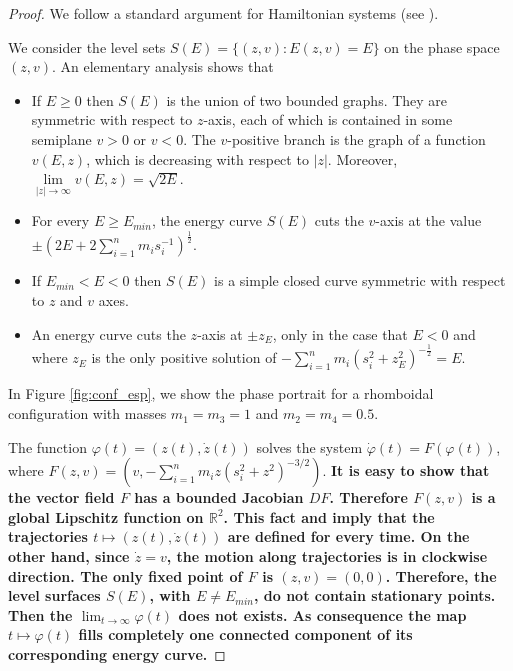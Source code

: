 \documentclass[smallcondensed]{svjour3}
\newcommand{\rr}{\mathbb{R}}
\begin{document}
\begin{proof}
We follow a standard argument for Hamiltonian systems (see \cite{A}).

We consider the level sets $S(E)=\{(z,v):E(z,v)=E\}$ on the phase space $(z,v)$. An elementary analysis shows that
\begin{itemize}
 \item If $E\geq 0$ then $S(E)$ is the union of two bounded graphs. They are symmetric with respect to $z$-axis, each of which is contained  in some semiplane $v> 0$ or $v<0$. The $v$-positive branch is the graph of a function $v(E,z)$, which  is decreasing with respect to $|z|$. Moreover, $\lim\limits_{|z|\to \infty}v(E,z)=\sqrt{2E}$.

 \item For every $E\geq E_{min}$, the energy curve $S(E)$ cuts the $v$-axis at the value $\pm(2E+2\sum_{i=1}^n m_is_i^{-1})^{\frac12}$.

 \item If $E_{min}<E<0$ then $S(E)$ is a simple closed curve symmetric with respect to $z$ and $v$ axes.

 \item  An energy curve cuts the $z$-axis at $\pm z_{E}$, only in the case that $E<0$ and where $z_E$ is the only positive solution of $-\sum_{i=1}^n m_i (s_i^2+z_{E}^2)^{-\frac12}=E$.
\end{itemize}

In Figure  \ref{fig:conf_esp}, we show the phase portrait for a rhomboidal configuration with masses $m_1=m_3=1$ and $m_2=m_4=0.5$.

The function $\varphi(t)=(z(t),\dot{z}(t))$ solves the system $\dot{\varphi}(t)=F(\varphi(t))$, where \linebreak $F(z,v)=(v,-\sum_{i=1}^{n}m_iz (s_i^2+z^2)^{-3/2})$. \textbf{It is easy to show that the vector field $F$ has a bounded Jacobian  $D F$. Therefore $F(z,v)$ is a global Lipschitz function on $\rr^2$. This fact and \cite[Th. B.1]{betounes2009differential} imply that the trajectories $t\mapsto (z(t),\dot{z}(t))$ are defined for every time. On the other hand, since $\dot{z}=v$, the motion along trajectories is in clockwise direction. The only fixed point of $F$ is $(z,v)=(0,0)$.  Therefore, the level surfaces $S(E)$, with $E\neq E_{min}$, do not contain stationary points. Then the $\lim_{t\to\infty}\varphi(t)$ does not exists.  As consequence the map $t\mapsto \varphi(t)$    fills completely one connected component of its corresponding   energy curve.}


\end{proof}
\end{document}
